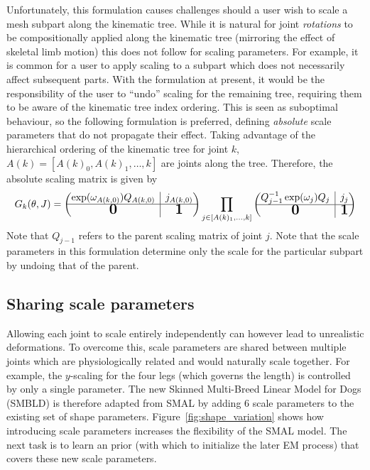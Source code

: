Unfortunately, this formulation causes challenges should a user wish to scale a mesh subpart along the kinematic tree. While it is natural for joint \emph{rotations} to be compositionally applied along the kinematic tree (mirroring the effect of skeletal limb motion) this does not follow for scaling parameters. For example, it is common for a user to apply scaling to a subpart which does not necessarily affect subsequent parts. With the formulation at present, it would be the responsibility of the user to ``undo'' scaling for the remaining tree, requiring them to be aware of the kinematic tree index ordering. This is seen as suboptimal behaviour, so the following formulation is preferred, defining \emph{absolute} scale parameters that do not propagate their effect. Taking advantage of the hierarchical ordering of the kinematic tree for joint $k$, $A(k) = \left[A(k)_{0}, A(k)_{1}, \dots, k\right]$ are joints along the tree. Therefore, the absolute scaling matrix is given by
\begin{equation}
    G_{k}(\pose,\smalrestJ) = 
    \begin{pmatrix}
        \exp(\poseele{A(k,0)}) Q_{A(k,0)}
        & \rvline 
        & j_{A(k,0)} \\
    \hline
        \bigzero
        & \rvline 
        & \bigone
    \end{pmatrix}
    \prod_{j \in \left[A(k)_{1}, \dots, k \right]}
        \begin{pmatrix}
            Q_{j-1}^{-1} \exp(\poseele{j}) Q_{j}
            & \rvline 
            & j_{j} \\
        \hline
            \bigzero
            & \rvline 
            & \bigone
        \end{pmatrix}
\end{equation}
Note that $Q_{j-1}$ refers to the parent scaling matrix of joint $j$. Note that the scale parameters in this formulation determine only the scale for the particular subpart by undoing that of the parent.

\subsection{Sharing scale parameters}

Allowing each joint to scale entirely independently can however lead to unrealistic deformations. To overcome this, scale parameters are shared between multiple joints which are physiologically related and would naturally scale together. For example, the $y$-scaling for the four legs (which governs the length) is controlled by only a single parameter. The new Skinned Multi-Breed Linear Model for Dogs (SMBLD) is therefore adapted from SMAL by adding $6$ scale parameters to the existing set of shape parameters. Figure~\ref{fig:shape_variation} shows how introducing scale parameters increases the flexibility of the SMAL model. The next task is to learn an prior (with which to initialize the later EM process) that covers these new scale parameters. 

